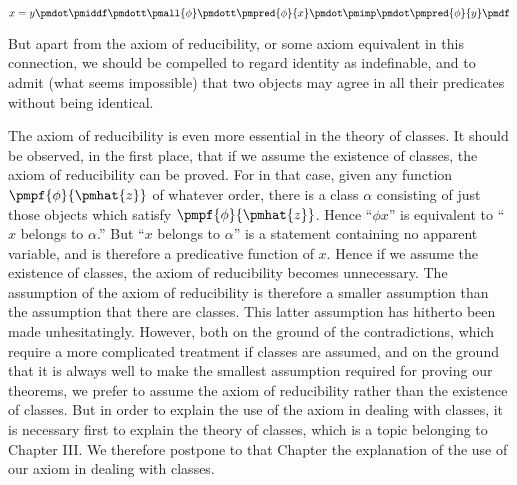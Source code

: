 \documentclass[letterpaper,12pt,openany,leqno]{book}
\newcommand{\pagefirst}[1]{\marginnote[\boxed{\text{#1}}]{\boxed{\text{#1}}}}
\begin{document}
\[
	x=y \pmdot \pmiddf \pmdott \pmall{\phi} \pmdott \pmpred{\phi}{x} \pmdot \pmimp \pmdot \pmpred{\phi}{y} \pmdf
\]

But apart from the axiom of reducibility, or some axiom equivalent in this connection, we should be compelled to regard identity as indefinable, and to admit (what seems impossible) that two objects may agree in all their predicates without being identical. 

The axiom of reducibility is even more essential in the theory of classes. It should be observed, in the first place, that if we assume the existence of classes, the axiom of reducibility can be proved. For in that case, given any function $\pmpf{\phi}{\pmhat{z}}$ of whatever order, there is a class $\alpha$ consisting of just those objects which satisfy $\pmpf{\phi}{\pmhat{z}}$. Hence ``$\phi x$'' is equivalent to ``$x$ belongs to $\alpha$.'' But ``$x$ belongs to $\alpha$'' is a statement containing no apparent variable, and is therefore a predicative function of $x$. Hence if we assume the existence of \pagefirst{61} classes, the axiom of reducibility becomes unnecessary. The assumption of the axiom of reducibility is therefore a smaller assumption than the assumption that there are classes. This latter assumption has hitherto been made unhesitatingly. However, both on the ground of the contradictions, which require a more complicated treatment if classes are assumed, and on the ground that it is always well to make the smallest assumption required for proving our theorems, we prefer to assume the axiom of reducibility rather than the existence of classes. But in order to explain the use of the axiom in dealing with classes, it is necessary first to explain the theory of classes, which is a topic belonging to Chapter III. We therefore postpone to that Chapter the explanation of the use of our axiom in dealing with classes.
\end{document}

